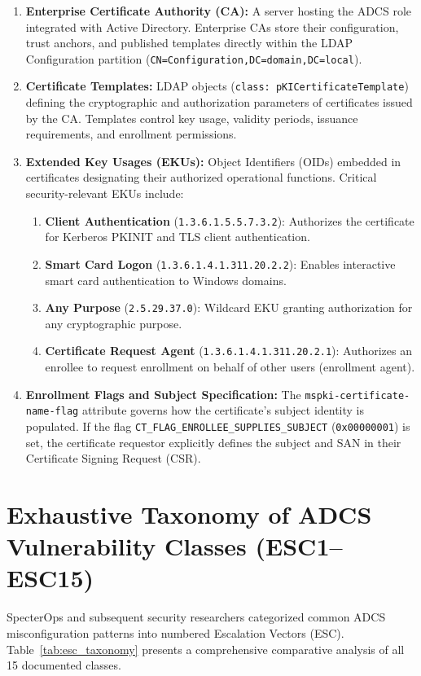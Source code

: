 \begin{enumerate}
    \item \textbf{Enterprise Certificate Authority (CA):} A server hosting the ADCS role integrated with Active Directory. Enterprise CAs store their configuration, trust anchors, and published templates directly within the LDAP Configuration partition (\nolinkurl{CN=Configuration,DC=domain,DC=local}).
    \item \textbf{Certificate Templates:} LDAP objects (\texttt{class: pKICertificateTemplate}) defining the cryptographic and authorization parameters of certificates issued by the CA. Templates control key usage, validity periods, issuance requirements, and enrollment permissions.
    \item \textbf{Extended Key Usages (EKUs):} Object Identifiers (OIDs) embedded in certificates designating their authorized operational functions. Critical security-relevant EKUs include:
    \begin{enumerate}
        \item \textbf{Client Authentication} (\texttt{1.3.6.1.5.5.7.3.2}): Authorizes the certificate for Kerberos PKINIT and TLS client authentication.
        \item \textbf{Smart Card Logon} (\texttt{1.3.6.1.4.1.311.20.2.2}): Enables interactive smart card authentication to Windows domains.
        \item \textbf{Any Purpose} (\texttt{2.5.29.37.0}): Wildcard EKU granting authorization for any cryptographic purpose.
        \item \textbf{Certificate Request Agent} (\texttt{1.3.6.1.4.1.311.20.2.1}): Authorizes an enrollee to request enrollment on behalf of other users (enrollment agent).
    \end{enumerate}
    \item \textbf{Enrollment Flags and Subject Specification:} The \texttt{mspki-certificate-name-flag} attribute governs how the certificate's subject identity is populated. If the flag \texttt{CT\_FLAG\_ENROLLEE\_SUPPLIES\_SUBJECT} (\texttt{0x00000001}) is set, the certificate requestor explicitly defines the subject and SAN in their Certificate Signing Request (CSR).
\end{enumerate}

\section{Exhaustive Taxonomy of ADCS Vulnerability Classes (ESC1--ESC15)}
SpecterOps and subsequent security researchers categorized common ADCS misconfiguration patterns into numbered Escalation Vectors (ESC). Table~\ref{tab:esc_taxonomy} presents a comprehensive comparative analysis of all 15 documented classes.

